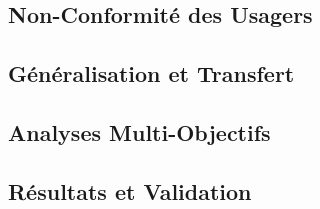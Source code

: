\subsection{Non-Conformité des Usagers}
\label{subsec:non_conformite_usagers}

\subsection{Généralisation et Transfert}
\label{subsec:generalisation_transfert}

\subsection{Analyses Multi-Objectifs}
\label{subsec:analyses_multi_objectifs}

\subsection{Résultats et Validation}
\label{subsec:resultats_scenarios}

